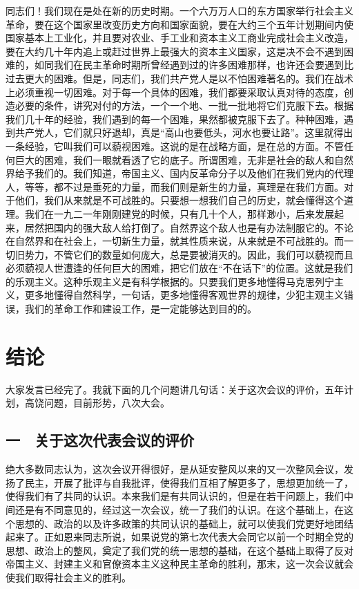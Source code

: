 同志们！我们现在是处在新的历史时期。一个六万万人口的东方国家举行社会主义革命，要在这个国家里改变历史方向和国家面貌，要在大约三个五年计划期间内使国家基本上工业化，并且要对农业、手工业和资本主义工商业完成社会主义改造，要在大约几十年内追上或赶过世界上最强大的资本主义国家，这是决不会不遇到困难的，如同我们在民主革命时期所曾经遇到过的许多困难那样，也许还会要遇到比过去更大的困难。但是，同志们，我们共产党人是以不怕困难著名的。我们在战术上必须重视一切困难。对于每一个具体的困难，我们都要采取认真对待的态度，创造必要的条件，讲究对付的方法，一个一个地、一批一批地将它们克服下去。根据我们几十年的经验，我们遇到的每一个困难，果然都被克服下去了。种种困难，遇到共产党人，它们就只好退却，真是“高山也要低头，河水也要让路”。这里就得出一条经验，它叫我们可以藐视困难。这说的是在战略方面，是在总的方面。不管任何巨大的困难，我们一眼就看透了它的底子。所谓困难，无非是社会的敌人和自然界给予我们的。我们知道，帝国主义、国内反革命分子以及他们在我们党内的代理人，等等，都不过是垂死的力量，而我们则是新生的力量，真理是在我们方面。对于他们，我们从来就是不可战胜的。只要想一想我们自己的历史，就会懂得这个道理。我们在一九二一年刚刚建党的时候，只有几十个人，那样渺小，后来发展起来，居然把国内的强大敌人给打倒了。自然界这个敌人也是有办法制服它的。不论在自然界和在社会上，一切新生力量，就其性质来说，从来就是不可战胜的。而一切旧势力，不管它们的数量如何庞大，总是要被消灭的。因此，我们可以藐视而且必须藐视人世遭逢的任何巨大的困难，把它们放在“不在话下”的位置。这就是我们的乐观主义。这种乐观主义是有科学根据的。只要我们更多地懂得马克思列宁主义，更多地懂得自然科学，一句话，更多地懂得客观世界的规律，少犯主观主义错误，我们的革命工作和建设工作，是一定能够达到目的的。

\date{一九五五年三月三十一日}
\section{结论}


大家发言已经完了。我就下面的几个问题讲几句话：关于这次会议的评价，五年计划，高饶问题，目前形势，八次大会。

\subsection{一　关于这次代表会议的评价}

绝大多数同志认为，这次会议开得很好，是从延安整风以来的又一次整风会议，发扬了民主，开展了批评与自我批评，使得我们互相了解更多了，思想更加统一了，使得我们有了共同的认识。本来我们是有共同认识的，但是在若干问题上，我们中间还是有不同意见的，经过这一次会议，统一了我们的认识。在这个基础上，在这个思想的、政治的以及许多政策的共同认识的基础上，就可以使我们党更好地团结起来了。正如恩来同志所说，如果说党的第七次代表大会同它以前一个时期全党的思想、政治上的整风，奠定了我们党的统一思想的基础，在这个基础上取得了反对帝国主义、封建主义和官僚资本主义这种民主革命的胜利，那末，这一次会议就会使我们取得社会主义的胜利。

